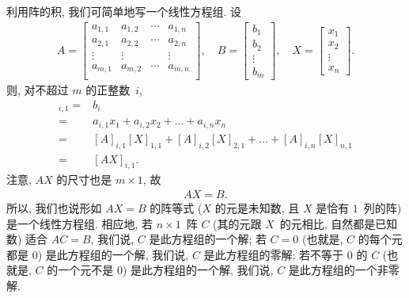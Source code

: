\documentclass[../libro.tex]{subfiles}
\begin{document}
利用阵的积, 我们可简单地写一个线性方程组.
设
\begin{align*}
    A =
    \begin{bmatrix}
        a_{1,1} & a_{1,2} & \cdots & a_{1,n} \\
        a_{2,1} & a_{2,2} & \cdots & a_{2,n} \\
        \vdots  & \vdots  & {}     & \vdots  \\
        a_{m,1} & a_{m,2} & \cdots & a_{m,n} \\
    \end{bmatrix},
    \quad
    B =
    \begin{bmatrix}
        b_1 \\ b_2 \\ \vdots \\ b_m
    \end{bmatrix},
    \quad
    X =
    \begin{bmatrix}
        x_1 \\ x_2 \\ \vdots \\ x_n
    \end{bmatrix}.
\end{align*}
则, 对不超过 \(m\) 的正整数~\(i\),
\begin{align*}
    [B]_{i,1}
    = {} &
    b_i
    \\
    = {} &
    a_{i,1} x_1 + a_{i,2} x_2 + \dots + a_{i,n} x_n
    \\
    = {} &
    [A]_{i,1} [X]_{1,1} + [A]_{i,2} [X]_{2,1}
    + \dots + [A]_{i,n} [X]_{n,1}
    \\
    = {} &
    [AX]_{i,1}.
\end{align*}
注意, \(AX\) 的尺寸也是 \(m \times 1\), 故
\begin{align*}
    AX = B.
\end{align*}
所以, 我们也说形如 \(AX = B\) 的阵等式
(\(X\) 的元是未知数, 且 \(X\) 是恰有 \(1\)~列的阵)
是一个线性方程组.
相应地, 若 \(n \times 1\)~阵 \(C\)
(其的元跟 \(X\)~的元相比, 自然都是已知数)
适合 \(AC = B\),
我们说, \(C\) 是此方程组的一个解;
若 \(C = 0\)
(也就是, \(C\) 的每个元都是 \(0\))
是此方程组的一个解,
我们说, \(C\) 是此方程组的零解;
若不等于 \(0\) 的 \(C\)
(也就是, \(C\) 的一个元不是 \(0\))
是此方程组的一个解,
我们说, \(C\) 是此方程组的一个非零解.
\end{document}
